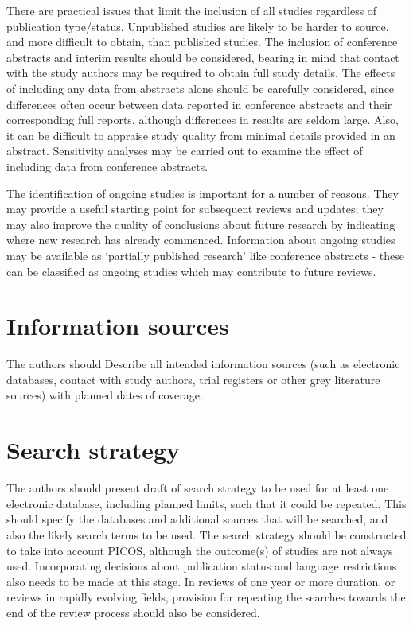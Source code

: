 \documentclass[
  11pt,
  a4paper,
  DIV=11,
  numbers=noendperiod]{scrreprt}
\begin{document}
There are practical issues that limit the inclusion of all studies
regardless of publication type/status. Unpublished studies are likely to
be harder to source, and more difficult to obtain, than published
studies. The inclusion of conference abstracts and interim results
should be considered, bearing in mind that contact with the study
authors may be required to obtain full study details. The effects of
including any data from abstracts alone should be carefully considered,
since differences often occur between data reported in conference
abstracts and their corresponding full reports, although differences in
results are seldom large. Also, it can be difficult to appraise study
quality from minimal details provided in an abstract. Sensitivity
analyses may be carried out to examine the effect of including data from
conference abstracts.

The identification of ongoing studies is important for a number of
reasons. They may provide a useful starting point for subsequent reviews
and updates; they may also improve the quality of conclusions about
future research by indicating where new research has already commenced.
Information about ongoing studies may be available as `partially
published research' like conference abstracts - these can be classified
as ongoing studies which may contribute to future reviews.

\section{Information sources}\label{information-sources}

The authors should Describe all intended information sources (such as
electronic databases, contact with study authors, trial registers or
other grey literature sources) with planned dates of coverage.

\section{Search strategy}\label{search-strategy}

The authors should present draft of search strategy to be used for at
least one electronic database, including planned limits, such that it
could be repeated. This should specify the databases and additional
sources that will be searched, and also the likely search terms to be
used. The search strategy should be constructed to take into account
PICOS, although the outcome(s) of studies are not always used.
Incorporating decisions about publication status and language
restrictions also needs to be made at this stage. In reviews of one year
or more duration, or reviews in rapidly evolving fields, provision for
repeating the searches towards the end of the review process should also
be considered.
\end{document}
